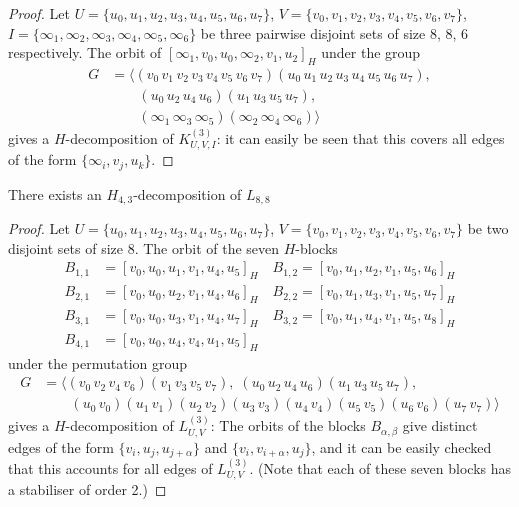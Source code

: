 \begin{subappendices}
\begin{proof}
Let $U = \{u_0, u_1, u_2, u_3, u_4, u_5, u_6, u_7\}$, $V = \{v_0, v_1, v_2,
v_3, v_4, v_5, v_6, v_7\}$, $I = \{\infty_1, \infty_2, \infty_3, \infty_4,
\infty_5, \infty_6\}$ be three pairwise disjoint sets of size 8, 8, 6
respectively. The orbit of $[\infty_1, v_0, u_0, \infty_2, v_1, u_2]_H$ under
the group
\begin{align*}
    G &= \langle
    (v_0 \, v_1 \, v_2 \, v_3 \, v_4 \, v_5 \, v_6 \, v_7)
    (u_0 \, u_1 \, u_2 \, u_3 \, u_4 \, u_5 \, u_6 \, u_7), \\
    & \quad \quad
    (u_0 \, u_2 \, u_4 \, u_6) (u_1 \, u_3 \, u_5 \, u_7), \\
    & \quad \quad
    (\infty_1 \, \infty_3 \, \infty_5) (\infty_2 \, \infty_4 \, \infty_6)
    \rangle
\end{align*}
gives a $H$-decomposition of $K_{U,V,I}^{(3)}$: it can easily be seen that this covers all edges of the form $\{\infty_i, v_j, u_k\}$.
\end{proof}



\begin{example} \label{eg:H_43-l88}
There exists an $H_{4,3}$-decomposition of $L_{8,8}$
\end{example}

\begin{proof}
Let $U = \{u_0, u_1, u_2, u_3, u_4, u_5, u_6, u_7\}$, $V = \{v_0, v_1, v_2,
v_3, v_4, v_5, v_6, v_7\}$ be two disjoint sets of size 8. The orbit of the
seven $H$-blocks
\begin{align*}
    B_{1,1} &= [v_0, u_0, u_1, v_1, u_4, u_5]_H \quad
    B_{1,2} = [v_0, u_1, u_2, v_1, u_5, u_6]_H \\
    B_{2,1} &= [v_0, u_0, u_2, v_1, u_4, u_6]_H \quad
    B_{2,2} = [v_0, u_1, u_3, v_1, u_5, u_7]_H \\
    B_{3,1} &= [v_0, u_0, u_3, v_1, u_4, u_7]_H \quad
    B_{3,2} = [v_0, u_1, u_4, v_1, u_5, u_8]_H \\
    B_{4,1} &= [v_0, u_0, u_4, v_4, u_1, u_5]_H
\end{align*}
under the permutation group
\begin{align*}
    G &= \langle (v_0 \, v_2 \, v_4 \, v_6) (v_1 \, v_3 \, v_5 \, v_7),
    \; (u_0 \, u_2 \, u_4 \, u_6) (u_1 \, u_3 \, u_5 \, u_7), \\
    & \quad \quad (u_0 \, v_0) (u_1 \, v_1) (u_2 \, v_2) (u_3 \, v_3) (u_4 \, v_4)
    (u_5 \, v_5) (u_6 \, v_6) (u_7 \, v_7) \rangle
\end{align*}
gives a $H$-decomposition of $L_{U,V}^{(3)}$: The orbits of the blocks $B_{\alpha,\beta}$ give distinct edges of the form $\{v_i, u_j, u_{j+\alpha}\}$ and $\{v_i, v_{i+\alpha}, u_j\}$, and it can be easily checked that this accounts for all edges of $L_{U,V}^{(3)}$. (Note that each of these seven blocks
has a stabiliser of order 2.)
\end{proof}




\end{subappendices}
